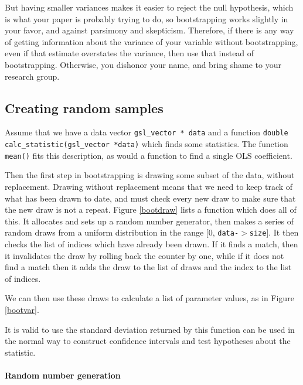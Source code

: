 But having smaller variances makes
it easier to reject the null hypothesis, which is what your paper is
probably trying to do, so bootstrapping works slightly in your favor,
and against parsimony and skepticism. Therefore, if there is any way
of getting information about the variance of your variable without
bootstrapping, even if that estimate overstates the variance, then use
that instead of bootstrapping. Otherwise, you dishonor your name, and
bring shame to your research group.


\subsection{Creating random samples} Assume that we have a
data vector {\tt gsl\_vector * data} and a function {\tt double
calc\_statistic(gsl\_vector *data)} which finds some statistics. The
function {\tt mean()} fits this description, as would a function to find
a single OLS coefficient.

Then the first step in bootstrapping is drawing some subset of the data,
without replacement. Drawing without replacement means that we need to
keep track of what has been drawn to date, and must check every new draw
to make sure that the new draw is not a repeat. Figure \ref{bootdraw} lists a function which
does all of this. It allocates and sets up a random number generator, then
makes a series of random draws from a uniform distribution in the range
[0, {\tt data-$>$size}]. It then checks the list of indices which have
already been drawn. If it finds a match, then it invalidates the draw
by rolling back the counter by one, while if it does not find a match then it
adds the draw to the list of draws and the index to the list of indices.


We can then use these draws to calculate a list of parameter values, as in Figure \ref{bootvar}.

It is valid to use the standard deviation returned by this function can
be used in the normal way to construct confidence intervals and test
hypotheses about the statistic.

\paragraph{Random number generation}\label{randomnumbers}

